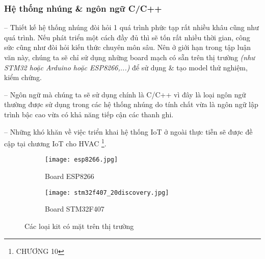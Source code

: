 	\subsubsection{Hệ thống nhúng \& ngôn ngữ C/C++}
	-- Thiết kế hệ thống nhúng đòi hỏi 1 quá trình phức tạp rất nhiều khâu cũng như quá trình. Nếu phát triển một cách đầy đủ thì sẽ tốn rất nhiều thời gian, công sức cũng như đòi hỏi kiến thức chuyên môn sâu. Nên ở giới hạn trong tập luận văn này, chúng ta sẽ chỉ sử dụng những board mạch có sẵn trên thị trường \textit{(như STM32 hoặc Arduino hoặc ESP8266,...)} để sử dụng \& tạo model thử nghiệm, kiểm chứng.
	
	-- Ngôn ngữ mà chúng ta sẽ sử dụng chính là C/C++ vì đây là loại ngôn ngữ thường được sử dụng trong các hệ thống nhúng do tính chất vừa là ngôn ngữ lập trình bậc cao vừa có khả năng tiếp cận các thanh ghi. 
	
	-- Những khó khăn về việc triển khai hệ thống IoT ở ngoài thực tiễn sẽ được đề cập tại chương IoT cho HVAC \footnote{CHƯƠNG 10}.

\begin{figure}[H]
\begin{subfigure}{0.5\textwidth}
\begin{center}
	\texttt{[image: esp8266.jpg]} 
	\caption{Board ESP8266}
\end{center}
\end{subfigure}
\begin{subfigure}{0.5\textwidth}
\begin{center}
		\texttt{[image: stm32f407\_20discovery.jpg]}
	\caption{Board STM32F407}
\end{center}
\end{subfigure}
\caption{Các loại kit có mặt trên thị trường}	
\end{figure}

	